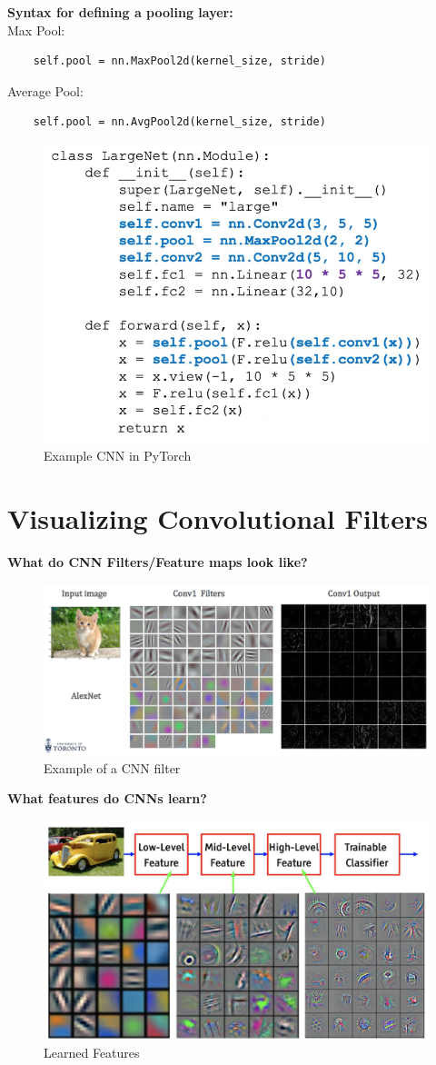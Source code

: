\begin{example}
    \textbf{Syntax for defining a pooling layer:}\\

Max Pool:
\begin{verbatim}
    self.pool = nn.MaxPool2d(kernel_size, stride)
\end{verbatim}
Average Pool:
\begin{verbatim}
    self.pool = nn.AvgPool2d(kernel_size, stride)
\end{verbatim}
\end{example}

\begin{figure}[h!t]
    \centering
    \includegraphics[width=0.5\linewidth]{samplecnnpytorch.png}
    \caption{Example CNN in PyTorch}
    \label{fig:enter-label}
\end{figure}


\section{Visualizing Convolutional Filters}

\textbf{What do CNN Filters/Feature maps look like?}

\begin{figure}[h!t]
    \centering
    \includegraphics[width=0.4\linewidth]{cnnfilters.png}
    \caption{Example of a CNN filter}
    \label{fig:enter-label}
\end{figure}

\textbf{What features do CNNs learn?}

\begin{figure}[h!t]
    \centering
    \includegraphics[width=0.5\linewidth]{learnedfeaturescnn.png}
    \caption{Learned Features}
    \label{fig:enter-label}
\end{figure}



